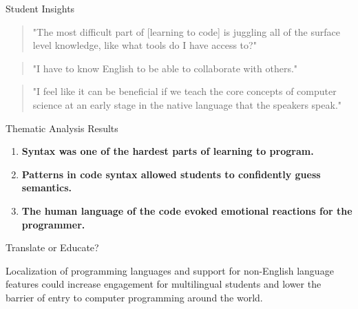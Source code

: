 \documentclass[final]{beamer}
\newlength{\colwidth}
\begin{document}
\begin{frame}[t]
\begin{columns}[t]
\begin{column}{\colwidth}
  \begin{exampleblock}{Student Insights}
    \vspace{7mm}
    \begin{quotation}
      "The most difficult part of [learning to code] is juggling all of the surface level knowledge, like what tools do I have access to?"
    \end{quotation}
    \begin{quotation}
      "I have to know English to be able to collaborate with others."
    \end{quotation}
    \begin{quotation}
      "I feel like it can be beneficial if we teach the core concepts of computer science at an early stage in the native language that the speakers speak."
    \end{quotation}
  \end{exampleblock}
  \vspace{-14mm}

  \begin{alertblock}{Thematic Analysis Results}
    \vspace{4mm}
    \begin{enumerate}
      \item \textbf{Syntax was one of the hardest parts of learning to program.}
      \item \textbf{Patterns in code syntax allowed students to confidently guess semantics.}
      \item \textbf{The human language of the code evoked emotional reactions for the programmer.}
    \end{enumerate}
  \end{alertblock}
  \vspace{2mm}

  \begin{block}{Translate or Educate?}
    \vspace{-7mm}

    Localization of programming languages and support for non-English language
    features could increase engagement for multilingual students and lower the 
    barrier of entry to computer programming around the world. \cite{codeTranslation}\cite{soosairajEngagement}\cite{hermansFramework}
    
  \end{block}
  \vspace{2mm}


\end{column}
\end{columns}
\end{frame}
\end{document}
